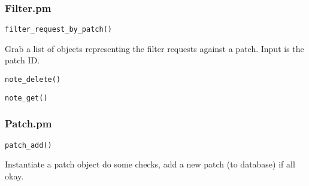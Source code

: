 \subsubsection{Filter.pm}

\begin{verbatim}
filter_request_by_patch()
\end{verbatim}
Grab a list of objects representing the filter requests against a patch.  Input is the patch ID.


\begin{verbatim}
note_delete()
\end{verbatim}

\begin{verbatim}
note_get()
\end{verbatim}


\subsubsection{Patch.pm}

\begin{verbatim}
patch_add()
\end{verbatim}
Instantiate a patch object do some checks, add a new patch (to database) if all okay.

